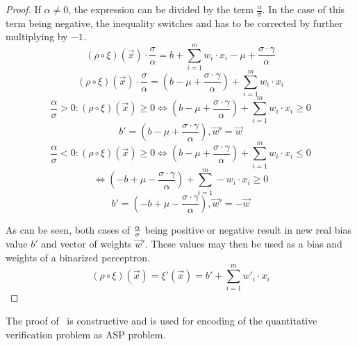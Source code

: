 \begin{lemma}
\begin{proof}
If $\alpha \neq 0$, the expression can be divided by the term $\frac{\alpha}{\sigma}$.
In the case of this term being negative, the inequality switches and has to be corrected
by further multiplying by $-1$.
\begin{equation*}
	(\rho \circ \xi)(\vec x) \cdot \frac{\sigma}{\alpha} =
	b + \sum_{i=1}^m w_i\cdot x_i -\mu + \frac{\sigma\cdot \gamma}{\alpha}
\end{equation*}
\begin{equation*}
	(\rho \circ \xi)(\vec x) \cdot \frac{\sigma}{\alpha} =
	(b -\mu + \frac{\sigma\cdot \gamma}{\alpha}) + \sum_{i=1}^m w_i\cdot x_i
\end{equation*}
\begin{equation*}
	\frac{\alpha}{\sigma} > 0 :
		(\rho\circ\xi)(\vec x)\geq 0 \iff 
		(b -\mu + \frac{\sigma\cdot \gamma}{\alpha}) + \sum_{i=1}^m w_i\cdot x_i \geq 0
\end{equation*}
\begin{equation*}
    b' = (b -\mu + \frac{\sigma\cdot \gamma}{\alpha}), \vec w' = \vec w
\end{equation*}
\begin{equation*}
	\frac{\alpha}{\sigma} < 0 :
		(\rho\circ\xi)(\vec x)\geq 0 \iff 
		(b -\mu + \frac{\sigma\cdot \gamma}{\alpha}) + \sum_{i=1}^m w_i\cdot x_i \leq 0
\end{equation*}
\begin{equation*}
	\iff (-b +\mu - \frac{\sigma\cdot \gamma}{\alpha}) + \sum_{i=1}^m -w_i\cdot x_i \geq 0
\end{equation*}
\begin{equation*}
    b' = (-b +\mu - \frac{\sigma\cdot \gamma}{\alpha}), \vec w' = -\vec w
\end{equation*}

As can be seen, both cases of $\alpha\over\sigma$ being positive or negative
result in new real bias value $b'$ and vector of weights $\vec w'$.
These values may then be used as a bias and weights of a binarized perceptron.
    \begin{equation*}
        (\rho \circ \xi)(\vec x) = \xi'(\vec x) = b' + \sum_{i=1}^m w'_i \cdot x_i
    \end{equation*}
\end{proof}
\end{lemma}

\begin{remark}
The proof of~ is constructive and is used for encoding
of the quantitative verification problem as ASP problem.
\end{remark}

